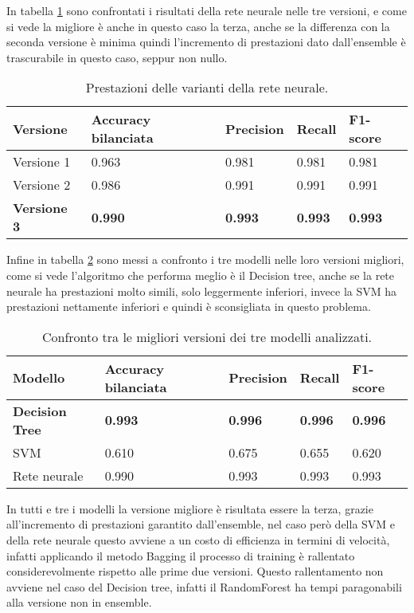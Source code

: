 In tabella \ref{tab:resnn} sono confrontati i risultati della rete neurale nelle tre versioni, e come si vede la migliore è anche in questo caso la terza, anche se la differenza con la seconda versione è minima quindi l'incremento di prestazioni dato dall'ensemble è trascurabile in questo caso, seppur non nullo.

\begin{table}[h] 
\centering
\begin{tabular}{l l l l l}
\hline
\textbf{Versione} & \textbf{Accuracy bilanciata} & \textbf{Precision} & \textbf{Recall} & \textbf{F1-score}\\
\hline
Versione 1 & 0.963 & 0.981 & 0.981 & 0.981 \\
Versione 2 & 0.986 & 0.991 & 0.991 & 0.991 \\
\textbf{Versione 3} & \textbf{0.990} & \textbf{0.993} & \textbf{0.993} & \textbf{0.993} \\
\hline
\end{tabular}
\caption{Prestazioni delle varianti della rete neurale.}
\label{tab:resnn}
\end{table}

Infine in tabella \ref{tab:resbest} sono messi a confronto i tre modelli nelle loro versioni migliori, come si vede l'algoritmo che performa meglio è il Decision tree, anche se la rete neurale ha prestazioni molto simili, solo leggermente inferiori, invece la SVM ha prestazioni nettamente inferiori e quindi è sconsigliata in questo problema.

\begin{table}[h] 
\centering
\begin{tabular}{l l l l l}
\hline
\textbf{Modello} & \textbf{Accuracy bilanciata} & \textbf{Precision} & \textbf{Recall} & \textbf{F1-score}\\
\hline
\textbf{Decision Tree} & \textbf{0.993} & \textbf{0.996} & \textbf{0.996} & \textbf{0.996} \\
SVM & 0.610 & 0.675 & 0.655 & 0.620 \\
Rete neurale & 0.990 & 0.993 & 0.993 & 0.993 \\
\hline
\end{tabular}
\caption{Confronto tra le migliori versioni dei tre modelli analizzati.}
\label{tab:resbest}
\end{table}

In tutti e tre i modelli la versione migliore è risultata essere la terza, grazie all'incremento di prestazioni garantito dall'ensemble, nel caso però della SVM e della rete neurale questo avviene a un costo di efficienza in termini di velocità, infatti applicando il metodo Bagging il processo di training è rallentato considerevolmente rispetto alle prime due versioni. Questo rallentamento non avviene nel caso del Decision tree, infatti il RandomForest ha tempi paragonabili alla versione non in ensemble. 


